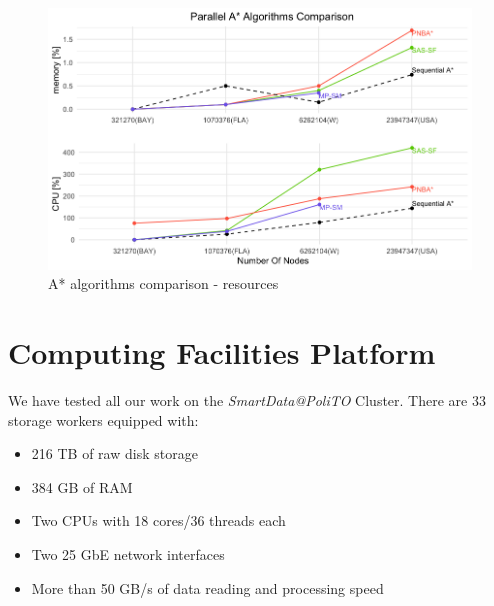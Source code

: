 \documentclass[twocolumn, switch]{article} %
\begin{document}
\begin{figure}[ht!]
  \centering
  \includegraphics[width=1\linewidth]{others/all_algo_cpumem.png}
  \caption{A* algorithms comparison - resources}
  \label{allalgocpumem}
\end{figure}
\section{Computing Facilities Platform}
We have tested all our work on the \textit{SmartData@PoliTO} Cluster.
There are $33$ storage workers equipped with:
\begin{itemize}
  \item 216 TB of raw disk storage
  \item 384 GB of RAM
  \item Two CPUs with 18 cores/36 threads each
  \item Two 25 GbE network interfaces
  \item More than 50 GB/s of data reading and processing speed
\end{itemize}
\end{document}
